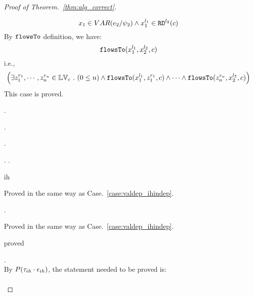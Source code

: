 \begin{proof}[Proof of Theorem.~\ref{thm:alg_correct}]
\begin{case}[$P(\cdot)$]
\[
  x_1 \in VAR(e_2 / \psi_2) 
  \land x_1^{l_1} \in \mathtt{RD}^{l_2}(c)
\]
%
By $\flowsto$ definition, we have:
%
\[
\mathtt{flowsTo}(x_1^{l_1}, {x}_2^{l_2}, c)
\]
i.e.,
%
\[
\Big(\exists z_1^{r_1}, \cdots, z_n^{r_n} \in \mathbb{LV}_{{c}} ~.~ (0 \leq n )
 \land \mathtt{flowsTo}(x_1^{l_1}, z_1^{r_1}, c) \land \cdots \land \mathtt{flowsTo}(z_n^{r_n}, {x}_2^{l_2}, c) \Big)
 \]
%
This case is proved.
\end{case}
%
\begin{case}
\label{case:valdep_ih}.
\begin{subcase}
\label{case:valdep_ihindep}.
\end{subcase}
\begin{subcase}
\label{case:valdep_ihdep}.
\begin{subsubcase}.
\label{case:valdep_ihdepasn}.
\begin{subsubsubcase}
ih
\end{subsubsubcase}
\begin{subsubsubcase}
Proved in the same way as Case.~\ref{case:valdep_ihindep}.
\end{subsubsubcase}
\end{subsubcase}
\begin{subsubcase}.
\begin{subsubsubcase}
Proved in the same way as Case.~\ref{case:valdep_ihindep}.
\end{subsubsubcase}
\begin{subsubsubcase}
proved 
\end{subsubsubcase}
\end{subsubcase}
\end{subcase}
\end{case}
\begin{case}
\label{case:valdep_ih}.
\\
%
By $P(\trace_{ih} \cdot \event_{ih})$, the statement needed to be proved is:
$$
\begin{array}{l}

\end{array}$$
\end{case}
\end{proof}
